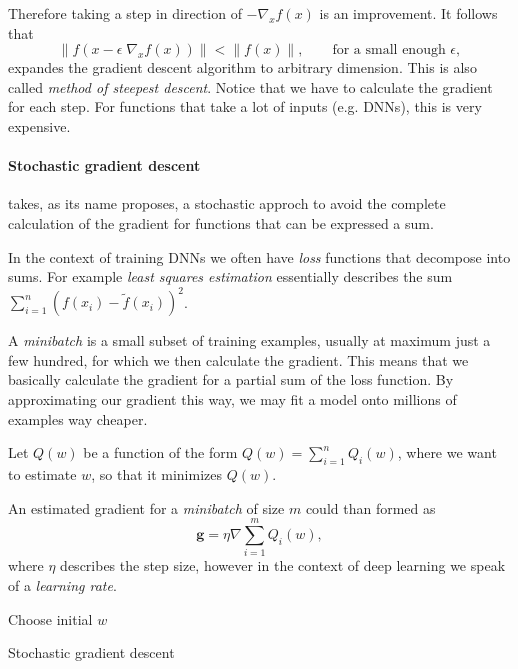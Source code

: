 Therefore taking a step in direction of \(-\nabla_x f(x)\) is an improvement.
It follows that
\begin{equation}
    \lVert f(x - \epsilon \; \nabla_x f(x)) \rVert < \lVert f(x) \rVert, \qquad \text{for a small enough } \epsilon,
\end{equation}
expandes the gradient descent algorithm to arbitrary dimension. This is also called \emph{method of steepest descent}.
Notice that we have to calculate the gradient for each step.
For functions that take a lot of inputs (e.g. DNNs), this is very expensive.

\paragraph{Stochastic gradient descent} takes, as its name proposes, a stochastic approch to avoid the complete calculation of the gradient for functions that can be expressed a sum.

In the context of training DNNs we often have \emph{loss} functions that decompose into sums.
For example \emph{least squares estimation} essentially describes the sum \(\sum^{n}_{i = 1} (f(x_i) - \tilde{f}(x_i))^2\).

A \emph{minibatch} is a small subset of training examples, usually at maximum just a few hundred, for which we then calculate the gradient.
This means that we basically calculate the gradient for a partial sum of the loss function.
By approximating our gradient this way, we may fit a model onto millions of examples way cheaper. 

Let \(Q(w)\) be a function of the form \(Q(w) = \sum^{n}_{i = 1} Q_i(w)\), where we want to estimate \(w\), so that it minimizes \(Q(w)\).

An estimated gradient for a \emph{minibatch} of size \(m\) could than formed as
\begin{equation}
    \boldsymbol{g} = \eta \nabla \sum^{m}_{i = 1} Q_i(w),
\end{equation}
where \(\eta\) describes the step size, however in the context of deep learning we speak of a \emph{learning rate}.

\begin{algorithm}[H]
    \BlankLine
    Choose initial $w$\;
    \caption{Stochastic gradient descent}
\end{algorithm}